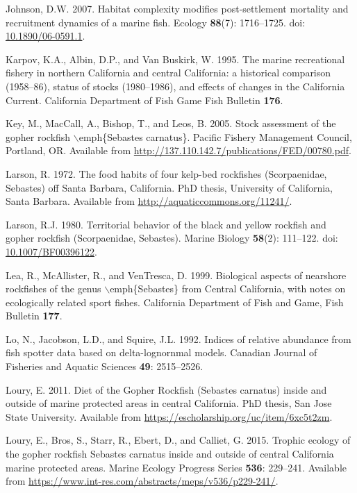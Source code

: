 \documentclass[12pt,]{article}
\begin{document}
\hypertarget{ref-Johnson2007}{}
Johnson, D.W. 2007. Habitat complexity modifies post-settlement
mortality and recruitment dynamics of a marine fish. Ecology
\textbf{88}(7): 1716--1725. doi:
\href{https://doi.org/10.1890/06-0591.1}{10.1890/06-0591.1}.

\hypertarget{ref-Karpov1995}{}
Karpov, K.A., Albin, D.P., and Van Buskirk, W. 1995. The marine
recreational fishery in northern California and central California: a
historical comparison (1958--86), status of stocks (1980--1986), and
effects of changes in the California Current. California Department of
Fish Game Fish Bulletin \textbf{176}.

\hypertarget{ref-Key2005}{}
Key, M., MacCall, A., Bishop, T., and Leos, B. 2005. Stock assessment of
the gopher rockfish \(\backslash\)emph\{Sebastes carnatus\}. Pacific
Fishery Management Council, Portland, OR. Available from
\url{http://137.110.142.7/publications/FED/00780.pdf}.

\hypertarget{ref-Larson1972}{}
Larson, R. 1972. The food habits of four kelp-bed rockfishes
(Scorpaenidae, Sebastes) off Santa Barbara, California. PhD thesis,
University of California, Santa Barbara. Available from
\url{http://aquaticcommons.org/11241/}.

\hypertarget{ref-Larson1980}{}
Larson, R.J. 1980. Territorial behavior of the black and yellow rockfish
and gopher rockfish (Scorpaenidae, Sebastes). Marine Biology
\textbf{58}(2): 111--122. doi:
\href{https://doi.org/10.1007/BF00396122}{10.1007/BF00396122}.

\hypertarget{ref-Lea1999}{}
Lea, R., McAllister, R., and VenTresca, D. 1999. Biological aspects of
nearshore rockfishes of the genus \(\backslash\)emph\{Sebastes\} from
Central California, with notes on ecologically related sport fishes.
California Department of Fish and Game, Fish Bulletin \textbf{177}.

\hypertarget{ref-Lo1992}{}
Lo, N., Jacobson, L.D., and Squire, J.L. 1992. Indices of relative
abundance from fish spotter data based on delta-lognornmal models.
Canadian Journal of Fisheries and Aquatic Sciences \textbf{49}:
2515--2526.

\hypertarget{ref-Loury2011}{}
Loury, E. 2011. Diet of the Gopher Rockfish (Sebastes carnatus) inside
and outside of marine protected areas in central California. PhD thesis,
San Jose State University. Available from
\url{https://escholarship.org/uc/item/6xc5t2zm}.

\hypertarget{ref-Loury2015}{}
Loury, E., Bros, S., Starr, R., Ebert, D., and Calliet, G. 2015. Trophic
ecology of the gopher rockfish Sebastes carnatus inside and outside of
central California marine protected areas. Marine Ecology Progress
Series \textbf{536}: 229--241. Available from
\url{https://www.int-res.com/abstracts/meps/v536/p229-241/}.
\end{document}

